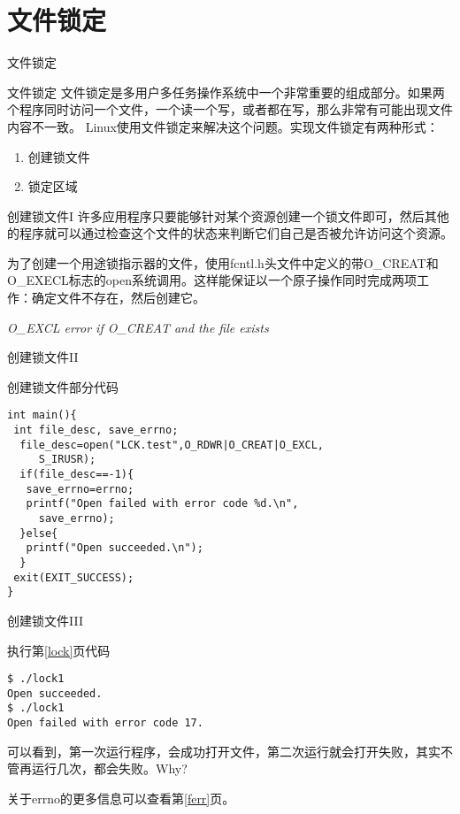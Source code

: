 \documentclass{beamer}
\begin{document}
\section{文件锁定}
\begin{frame}
\Huge{\centerline{文件锁定}}
\end{frame}
\begin{frame}{文件锁定}
文件锁定是多用户多任务操作系统中一个非常重要的组成部分。如果两个程序同时访问一个文件，一个读一个写，或者都在写，那么非常有可能出现文件内容不一致。
Linux使用文件锁定来解决这个问题。实现文件锁定有两种形式：
\begin{enumerate}
\item
创建锁文件
\item
锁定区域
\end{enumerate}
\end{frame}
\begin{frame}[fragile]{创建锁文件I}
许多应用程序只要能够针对某个资源创建一个锁文件即可，然后其他的程序就可以通过检查这个文件的状态来判断它们自己是否被允许访问这个资源。

为了创建一个用途锁指示器的文件，使用fcntl.h头文件中定义的带O\_CREAT和O\_EXECL标志的open系统调用。这样能保证以一个原子操作同时完成两项工作：确定文件不存在，然后创建它。
\begin{block}{}
\emph{O\_EXCL          error if O\_CREAT and the file exists}
\end{block}
\end{frame}
\begin{frame}[fragile]{创建锁文件II}
\label{lock}
\begin{block}{创建锁文件部分代码}
\begin{lstlisting}
int main(){
 int file_desc, save_errno;	
  file_desc=open("LCK.test",O_RDWR|O_CREAT|O_EXCL,
     S_IRUSR);
  if(file_desc==-1){
   save_errno=errno;
   printf("Open failed with error code %d.\n",
     save_errno);
  }else{
   printf("Open succeeded.\n");
  }
 exit(EXIT_SUCCESS);
}
\end{lstlisting}
\end{block}
\end{frame}
\begin{frame}[fragile]{创建锁文件III}
\begin{block}{执行第\ref{lock}页代码}
\begin{lstlisting}
$ ./lock1 
Open succeeded.
$ ./lock1 
Open failed with error code 17.
\end{lstlisting}
\end{block}
可以看到，第一次运行程序，会成功打开文件，第二次运行就会打开失败，其实不管再运行几次，都会失败。Why?

关于errno的更多信息可以查看第\ref{ferr}页。
\end{frame}
\end{document}
